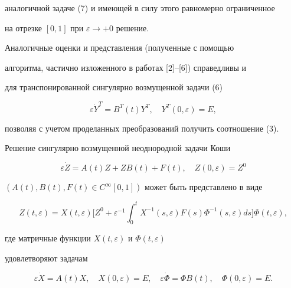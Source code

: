 \begin{pf}
аналогичной задаче (7) и имеющей в силу этого равномерно ограниченное 


на отрезке $[0,1]$ при $\varepsilon\to+0$ решение. 


 


Аналогичные оценки и представления (полученные с помощью 


алгоритма, частично изложенного в работах [2]--[6]) справедливы и 


для транспонированной сингулярно возмущенной задачи (6) 


$$ 


\varepsilon\Dot Y^T=B^T(t)Y^T,\quad 


Y^T(0,\varepsilon)=E, 


$$ 


позволяя с учетом проделанных преобразований получить соотношение (3). 


\end{pf} 


 


 


\begin{thm} 


Решение сингулярно возмущенной неоднородной задачи Коши 


\begin{equation} 


\varepsilon\Dot Z=A(t)Z+ZB(t)+F(t),\quad 


Z(0,\varepsilon)=Z^0 


\end{equation} 


$(A(t),B(t),F(t)\in C^\infty[0,1])$ может быть представлено в виде 


\begin{equation} 


Z(t,\varepsilon)=X(t,\varepsilon)\bigg[Z^0+\varepsilon^{-1} 


\int^t_0 X^{-1}(s,\varepsilon)F(s)\Phi^{-1} 


(s,\varepsilon)ds\bigg]\Phi(t,\varepsilon), 


\end{equation} 


где матричные функции $X(t,\varepsilon)$ и $\Phi(t,\varepsilon)$ 


удовлетворяют задачам 


$$ 


\varepsilon\Dot X=A(t)X,\quad X(0,\varepsilon)=E,\quad 


\varepsilon\Dot\Phi=\Phi B(t),\quad \Phi(0,\varepsilon)=E. 


$$ 


\end{thm} 


